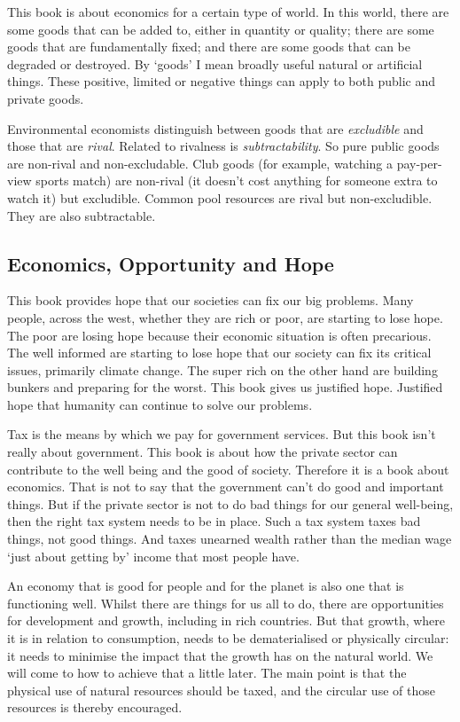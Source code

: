 \documentclass[]{tufte-handout}
\begin{document}
This book is about economics for a certain type of world. In this world,
there are some goods that can be added to, either in quantity or
quality; there are some goods that are fundamentally fixed; and there
are some goods that can be degraded or destroyed. By `goods' I mean
broadly useful natural or artificial things. These positive, limited or
negative things can apply to both public and private goods.

Environmental economists distinguish between goods that are
\emph{excludible} and those that are \emph{rival}. Related to rivalness
is \emph{subtractability}. So pure public goods are non-rival and
non-excludable. Club goods (for example, watching a pay-per-view sports
match) are non-rival (it doesn't cost anything for someone extra to
watch it) but excludible. Common pool resources are rival but
non-excludible. They are also subtractable.

\hypertarget{economics-opportunity-and-hope}{%
\subsection{Economics, Opportunity and
Hope}\label{economics-opportunity-and-hope}}

This book provides hope that our societies can fix our big problems.
Many people, across the west, whether they are rich or poor, are
starting to lose hope. The poor are losing hope because their economic
situation is often precarious. The well informed are starting to lose
hope that our society can fix its critical issues, primarily climate
change. The super rich on the other hand are building bunkers and
preparing for the worst. This book gives us justified hope. Justified
hope that humanity can continue to solve our problems.

Tax is the means by which we pay for government services. But this book
isn't really about government. This book is about how the private sector
can contribute to the well being and the good of society. Therefore it
is a book about economics. That is not to say that the government can't
do good and important things. But if the private sector is not to do bad
things for our general well-being, then the right tax system needs to be
in place. Such a tax system taxes bad things, not good things. And taxes
unearned wealth rather than the median wage `just about getting by'
income that most people have.

An economy that is good for people and for the planet is also one that
is functioning well. Whilst there are things for us all to do, there are
opportunities for development and growth, including in rich countries.
But that growth, where it is in relation to consumption, needs to be
dematerialised or physically circular: it needs to minimise the impact
that the growth has on the natural world. We will come to how to achieve
that a little later. The main point is that the physical use of natural
resources should be taxed, and the circular use of those resources is
thereby encouraged.
\end{document}

